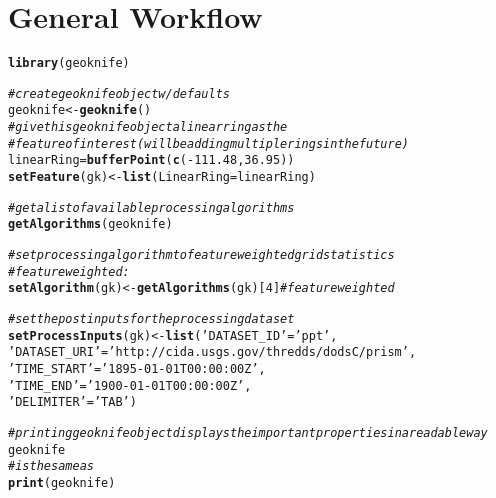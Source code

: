 \documentclass[a4paper,11pt]{article}\usepackage[]{graphicx}\usepackage[]{color}
\makeatletter
\newcommand{\hlnum}[1]{\textcolor[rgb]{0.686,0.059,0.569}{#1}}%
\newcommand{\hlstr}[1]{\textcolor[rgb]{0.192,0.494,0.8}{#1}}%
\newcommand{\hlcom}[1]{\textcolor[rgb]{0.678,0.584,0.686}{\textit{#1}}}%
\newcommand{\hlopt}[1]{\textcolor[rgb]{0,0,0}{#1}}%
\newcommand{\hlstd}[1]{\textcolor[rgb]{0.345,0.345,0.345}{#1}}%
\newcommand{\hlkwb}[1]{\textcolor[rgb]{0.69,0.353,0.396}{#1}}%
\newcommand{\hlkwc}[1]{\textcolor[rgb]{0.333,0.667,0.333}{#1}}%
\newcommand{\hlkwd}[1]{\textcolor[rgb]{0.737,0.353,0.396}{\textbf{#1}}}%
\newenvironment{kframe}{%
 \def\at@end@of@kframe{}%
 \ifinner\ifhmode%
  \def\at@end@of@kframe{\end{minipage}}%
  \begin{minipage}{\columnwidth}%
 \fi\fi%
 \def\FrameCommand##1{\hskip\@totalleftmargin \hskip-\fboxsep
 \colorbox{shadecolor}{##1}\hskip-\fboxsep
     \hskip-\linewidth \hskip-\@totalleftmargin \hskip\columnwidth}%
 \MakeFramed {\advance\hsize-\width
   \@totalleftmargin\z@ \linewidth\hsize
   \@setminipage}}%
 {\par\unskip\endMakeFramed%
 \at@end@of@kframe}
\newenvironment{knitrout}{}{} %
\makeatother
\begin{document}
\section{General Workflow}

\begin{knitrout}
\color{fgcolor}\begin{kframe}
\begin{alltt}
\hlkwd{library}\hlstd{(geoknife)}
\end{alltt}
\end{kframe}
\end{knitrout}

\begin{knitrout}
\color{fgcolor}\begin{kframe}
\begin{alltt}
\hlcom{# create geoknife object w/ defaults}
\hlstd{geoknife} \hlkwb{<-} \hlkwd{geoknife}\hlstd{()}
\hlcom{# give this geoknife object a linear ring as the }
\hlcom{# feature of interest (will be adding multiple rings in the future)}
\hlstd{linearRing} \hlkwb{=} \hlkwd{bufferPoint}\hlstd{(}\hlkwd{c}\hlstd{(}\hlopt{-}\hlnum{111.48}\hlstd{,}\hlnum{36.95}\hlstd{))}
\hlkwd{setFeature}\hlstd{(gk)} \hlkwb{<-}\hlkwd{list}\hlstd{(}\hlkwc{LinearRing}\hlstd{=linearRing)}

\hlcom{# get a list of available processing algorithms}
\hlkwd{getAlgorithms}\hlstd{(geoknife)}

\hlcom{# set processing algorithm to feature weighted grid statistics}
\hlcom{# feature weighted:}
\hlkwd{setAlgorithm}\hlstd{(gk)} \hlkwb{<-} \hlkwd{getAlgorithms}\hlstd{(gk)[}\hlnum{4}\hlstd{]} \hlcom{# feature weighted}

\hlcom{# set the post inputs for the processing dataset}
\hlkwd{setProcessInputs}\hlstd{(gk)} \hlkwb{<-} \hlkwd{list}\hlstd{(}\hlstr{'DATASET_ID'}\hlstd{=}\hlstr{'ppt'}\hlstd{,}
                             \hlstr{'DATASET_URI'}\hlstd{=}\hlstr{'http://cida.usgs.gov/thredds/dodsC/prism'}\hlstd{,}
                             \hlstr{'TIME_START'}\hlstd{=}\hlstr{'1895-01-01T00:00:00Z'}\hlstd{,}
                             \hlstr{'TIME_END'}\hlstd{=}\hlstr{'1900-01-01T00:00:00Z'}\hlstd{,}
                             \hlstr{'DELIMITER'}\hlstd{=}\hlstr{'TAB'}\hlstd{)}

\hlcom{# printing geoknife object displays the important properties in a readable way}
\hlstd{geoknife}
\hlcom{# is the same as }
\hlkwd{print}\hlstd{(geoknife)}


\end{alltt}
\end{kframe}
\end{knitrout}
\end{document}
